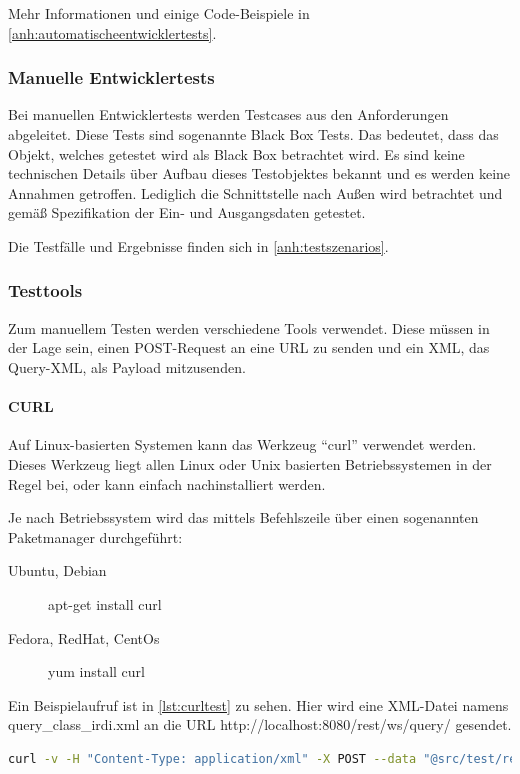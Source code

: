 Mehr Informationen und einige Code-Beispiele in \autoref{anh:automatischeentwicklertests}.

\subsubsection{Manuelle Entwicklertests}

Bei manuellen Entwicklertests werden Testcases aus den Anforderungen abgeleitet. Diese Tests sind sogenannte Black Box Tests. Das bedeutet, dass das Objekt, welches getestet wird als Black Box betrachtet wird. Es sind keine technischen Details über Aufbau dieses Testobjektes bekannt und es werden keine Annahmen getroffen. Lediglich die Schnittstelle nach Außen wird betrachtet und gemäß Spezifikation der Ein- und Ausgangsdaten getestet. 

Die Testfälle und Ergebnisse finden sich in \autoref{anh:testszenarios}.

\subsubsection{Testtools}

Zum manuellem Testen werden verschiedene Tools verwendet. Diese müssen in der Lage sein, einen POST-Request an eine URL zu senden und ein XML, das Query-XML, als Payload mitzusenden.

\paragraph{CURL}

Auf Linux-basierten Systemen kann das Werkzeug \enquote{curl} verwendet werden. Dieses Werkzeug liegt allen Linux oder Unix basierten Betriebssystemen in der Regel bei, oder kann einfach nachinstalliert werden. 

Je nach Betriebssystem wird das mittels Befehlszeile über einen sogenannten Paketmanager durchgeführt:
\begin{description}
\item[Ubuntu, Debian] apt-get install curl
\item[Fedora, RedHat, CentOs] yum install curl
\end{description}

Ein Beispielaufruf ist in \autoref{lst:curltest} zu sehen. Hier wird eine XML-Datei namens query\_class\_irdi.xml an die URL http://localhost:8080/rest/ws/query/ gesendet. 

\begin{lstlisting}[caption=CURL Test des REST Webservices, language=sh, label=lst:curltest]
curl -v -H "Content-Type: application/xml" -X POST --data "@src/test/resources/de/feu/plib/xml/query_class_irdi.xml" http://localhost:8080/rest/ws/query
 \end{lstlisting}   

